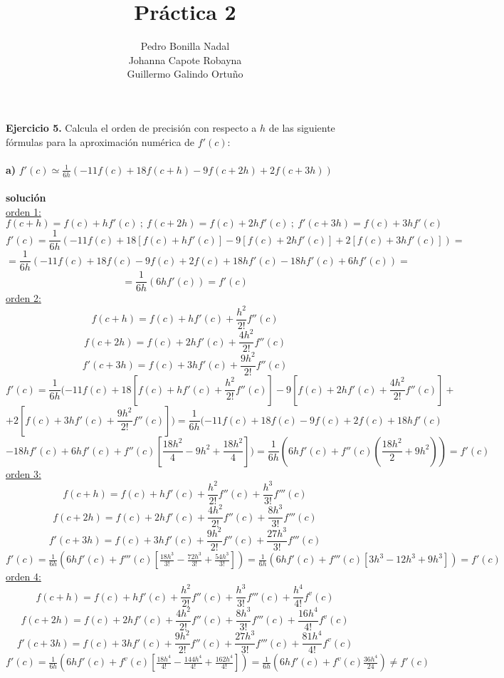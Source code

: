 \documentclass[11pt]{article}
\title{\textbf{Práctica 2}}
\author{Pedro Bonilla Nadal\\
		Johanna Capote Robayna\\
		Guillermo Galindo Ortuño}
\date{}
\begin{document}
\maketitle

\textbf{Ejercicio 5.} Calcula el orden de precisión con respecto a $h$ de las siguiente fórmulas para la aproximación numérica de $f'(c)$: \\ \\

\textbf{a)} $f'(c) \simeq \frac{1}{6h}(-11f(c) + 18f(c + h) -9f(c + 2h) +2f(c+3h))$ \\ \\
\textbf{solución} \\
\underline{orden 1:} \\
$$f(c + h) = f(c) + hf'(c) \ ; \ f(c + 2h) = f(c) + 2hf'(c) \ ; \ f'(c + 3h) = f(c) + 3hf'(c)$$
$$f'(c) = \frac{1}{6h}(-11f(c) + 18  [f(c) + hf'(c)] - 9  [f(c) + 2hf'(c)] + 2 [f(c) + 3hf'(c)]) = $$
$$= \frac{1}{6h}(-11f(c) + 18f(c) - 9f(c) + 2f(c) + 18hf'(c) - 18hf'(c) + 6hf'(c)) = $$
$$= \frac{1}{6h}(6hf'(c)) = f'(c) $$
\underline{orden 2:} \\
$$ f(c + h) = f(c) + hf'(c) + \frac{h^{2}}{2!} f''(c)$$ $$ f(c + 2h) = f(c) + 2hf'(c) + \frac{4h^{2}}{2!} f''(c)$$ $$f'(c + 3h) = f(c) + 3hf'(c) + \frac{9h^{2}}{2!} f''(c) $$
$$f'(c) = \frac{1}{6h}(-11f(c) + 18  [f(c) + hf'(c) + \frac{h^{2}}{2!} f''(c)] - 9  [f(c) + 2hf'(c) + \frac{4h^{2}}{2!} f''(c)] +$$ $$ + 2 [f(c) + 3hf'(c) + \frac{9h^{2}}{2!} f''(c)]) = \frac{1}{6h}(-11f(c) + 18f(c) - 9f(c) + 2f(c)  + 18hf'(c)  $$ $$- 18hf'(c) + 6hf'(c) + f''(c)[\frac{18h^{2}}{4} - 9h^{2} + \frac{18h^{2}}{4}]) = \frac{1}{6h}(6hf'(c) + f''(c)(\frac{18h^{2}}{2} + 9h^{2})) = f'(c)$$
\underline{orden 3:} \\
$$ f(c + h) = f(c) + hf'(c) + \frac{h^{2}}{2!} f''(c) + \frac{h^{3}}{3!}f'''(c)$$
$$ f(c + 2h) = f(c) + 2hf'(c) + \frac{4h^{2}}{2!} f''(c) + \frac{8h^{3}}{3!}f'''(c)$$ 
$$f'(c + 3h) = f(c) + 3hf'(c) + \frac{9h^{2}}{2!} f''(c) + \frac{27h^{3}}{3!}f'''(c)$$
$f'(c) = \frac{1}{6h}(6hf'(c) + f'''(c)[\frac{18h^{3}}{3!} - \frac{72h^{3}}{3!} + \frac{54h^{3}}{3!}]) =  \frac{1}{6h}(6hf'(c) + f'''(c)[3h^{3} - 12h^{3} + 9h^{3}]) = f'(c)  $ \\
\underline{orden 4:} \\
$$ f(c + h) = f(c) + hf'(c) + \frac{h^{2}}{2!} f''(c) + \frac{h^{3}}{3!}f'''(c) + \frac{h^{4}}{4!}f^{v}(c)$$
$$ f(c + 2h) = f(c) + 2hf'(c) + \frac{4h^{2}}{2!} f''(c) + \frac{8h^{3}}{3!}f'''(c) + \frac{16h^{4}}{4!}f^{v}(c)$$ 
$$f'(c + 3h) = f(c) + 3hf'(c) + \frac{9h^{2}}{2!} f''(c) + \frac{27h^{3}}{3!}f'''(c) + \frac{81h^{4}}{4!}f^{v}(c)$$
$f'(c) = \frac{1}{6h}(6hf'(c) + f^{v}(c)[\frac{18h^{4}}{4!} - \frac{144h^{4}}{4!} + \frac{162h^{4}}{4!}]) = \frac{1}{6h}(6hf'(c) + f^{v}(c)\frac{36h^{4}}{24}) \neq f'(c) $ \\
\end{document}
